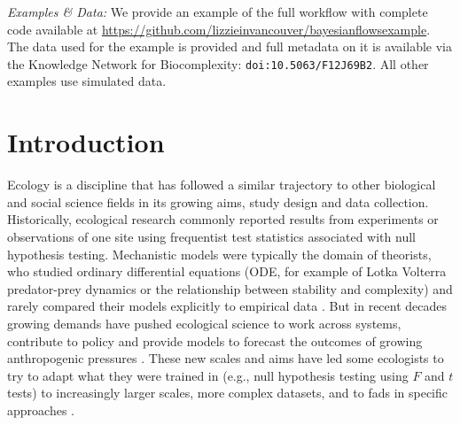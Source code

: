 \documentclass[11pt]{article}
\begin{document}
\vspace{3ex}
\noindent\emph{Examples \& Data:} We provide an example of the full workflow with complete code available at \url{https://github.com/lizzieinvancouver/bayesianflowsexample}. The data used for the example is provided and full metadata on it is available via the Knowledge Network for Biocomplexity: \verb|doi:10.5063/F12J69B2|. All other examples use simulated data.



\setlength{\parindent}{0pt}
\setlength{\parskip}{7pt}

\newpage

\section*{Introduction}
Ecology is a discipline that has followed a similar trajectory to other biological and social science fields in its growing aims, study design and data collection. Historically, ecological research commonly reported results from experiments or observations of one site using frequentist test statistics associated with null hypothesis testing. Mechanistic models were typically the domain of theorists, who studied ordinary differential equations (ODE, for example of Lotka Volterra predator-prey dynamics or the relationship between stability and complexity) and rarely compared their models explicitly to empirical data \citep[see][]{caswell1988}. But in recent decades growing demands have pushed ecological science to work across systems, contribute to policy and provide models to forecast the outcomes of growing anthropogenic pressures \citep{hak2016sustainable,lindenmayer2010science}. These new scales and aims have led some ecologists to try to adapt what they were trained in (e.g., null hypothesis testing using $F$ and $t$ tests) to increasingly larger scales, more complex datasets, and to fads in specific approaches  \citep{grace2025causal}. 
\end{document}
